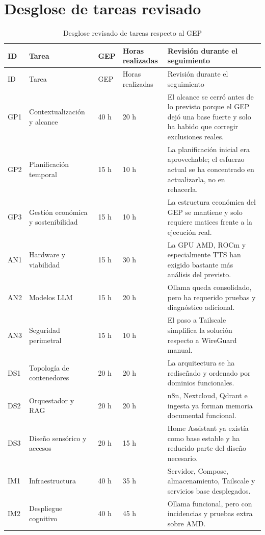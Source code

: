 \section{Desglose de tareas revisado}
\begin{longtable}{p{}p{}p{}p{}p{}}
  \caption{Desglose revisado de tareas respecto al GEP}
  \label{tab:tareas-revisadas}\\
  \toprule
  ID & Tarea & GEP & Horas realizadas & Revisión durante el seguimiento \\
  \midrule
  \endfirsthead
  \toprule
  ID & Tarea & GEP & Horas realizadas & Revisión durante el seguimiento \\
  \midrule
  \endhead
  \bottomrule
  \endfoot
  GP1 & Contextualización y alcance & 40 h & 20 h & El alcance se cerró antes de lo previsto porque el GEP dejó una base fuerte y solo ha habido que corregir exclusiones reales. \\
  GP2 & Planificación temporal & 15 h & 10 h & La planificación inicial era aprovechable; el esfuerzo actual se ha concentrado en actualizarla, no en rehacerla. \\
  GP3 & Gestión económica y sostenibilidad & 15 h & 10 h & La estructura económica del GEP se mantiene y solo requiere matices frente a la ejecución real. \\
  AN1 & Hardware y viabilidad & 15 h & 30 h & La GPU AMD, ROCm y especialmente TTS han exigido bastante más análisis del previsto. \\
  AN2 & Modelos LLM & 15 h & 20 h & Ollama queda consolidado, pero ha requerido pruebas y diagnóstico adicional. \\
  AN3 & Seguridad perimetral & 15 h & 10 h & El paso a Tailscale simplifica la solución respecto a WireGuard manual. \\
  DS1 & Topología de contenedores & 20 h & 20 h & La arquitectura se ha rediseñado y ordenado por dominios funcionales. \\
  DS2 & Orquestador y RAG & 20 h & 20 h & n8n, Nextcloud, Qdrant e ingesta ya forman memoria documental funcional. \\
  DS3 & Diseño sensórico y accesos & 20 h & 15 h & Home Assistant ya existía como base estable y ha reducido parte del diseño necesario. \\
  IM1 & Infraestructura & 40 h & 35 h & Servidor, Compose, almacenamiento, Tailscale y servicios base desplegados. \\
  IM2 & Despliegue cognitivo & 40 h & 45 h & Ollama funcional, pero con incidencias y pruebas extra sobre AMD. \\

\end{longtable}
